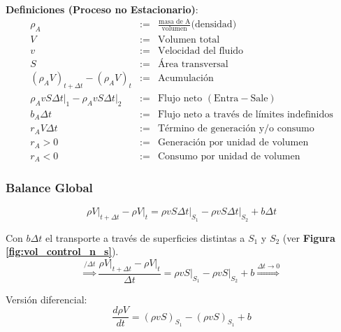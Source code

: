     \textbf{Definiciones (Proceso no Estacionario)}:
    \[
    \begin{array}{crl}
         \rho_{A} & := & \frac{\text{masa de A}}{\text{volumen}} \text{(densidad)} \\
         V & := & \text{Volumen total} \\
         v & := & \text{Velocidad del fluido} \\
         S & := & \text{Área transversal} \\
         \left ( \rho_{A} V \right )_{t + \Delta t} - \left ( \rho_{A} V \right )_{t} & := & \text{Acumulación} \\
         \rho_{A} v S \Delta t {|}_{1} - \rho_{A} v S \Delta t {|}_{2} & := & \text{Flujo neto } \left (\text{Entra} - \text{Sale} \right )\\
         b_{A}\Delta t & := & \text{Flujo neto a través de límites indefinidos} \\
         r_{A}V\Delta t & := & \text{Término de generación y/o consumo} \\
         r_{A} > 0 & := & \text{Generación por unidad de volumen} \\
         r_{A} < 0 & := & \text{Consumo por unidad de volumen}
    \end{array}
    \]
    
        \subsubsection{Balance Global}
        \begin{equation}
        \label{eq:balance_masa_ns_global}
            \rho V {|}_{t + \Delta t} - \rho V {|}_{t} = \rho v S \Delta t {|}_{S_{1}} - \rho v S \Delta t {|}_{S_{2}} + b \Delta t
        \end{equation}
        
        Con \(b \Delta t\) el transporte a través de superficies distintas a \(S_{1}\) y \(S_{2}\) (ver \textbf{Figura \ref{fig:vol_control_n_s}}).
        \[\overset{/\Delta t}{\Rightarrow} \frac{\rho V {|}_{t + \Delta t} - \rho V {|}_{t}}{\Delta t} = \rho v S {|}_{S_{1}} - \rho v S {|}_{S_{2}} + b \overset{\Delta t \rightarrow 0}{\Rightarrow}\]
        
        Versión diferencial:
        \begin{equation}
        \label{eq:balance_masa_ns_global_dif}
            \frac{d\rho V}{dt} = \left ( \rho v S \right )_{S_{1}} - \left ( \rho v S \right )_{S_{1}} + b
        \end{equation}
        
